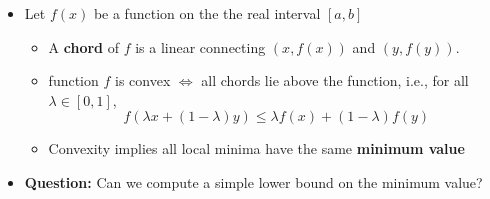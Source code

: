 \documentclass[11pt,twoside]{report}
\begin{document}
\begin{itemize}

\item Let $f(x)$ be a function on the the real interval $[a,b]$
\begin{itemize}
\item A \textbf{chord} of $f$ is a linear connecting $(x, f(x))$ and $(y, f(y))$. 
\item function $f$ is convex $\iff $ all chords lie above the function, i.e., for all $\lambda \in [0,1]$, 
\[ f(\lambda x +(1-\lambda) y) \leq \lambda f(x) + (1-\lambda) f(y) \] 

\item Convexity implies all local minima have the same \textbf{minimum value} 


\end{itemize}

\begin{center}
\end{center}

\item \textbf{Question:} Can we compute a simple lower bound on the minimum value? 


\begin{itemize}


\end{itemize}
\end{itemize}
\end{document}
